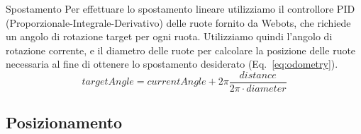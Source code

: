 \documentclass[10pt]{beamer}
\begin{document}
	\begin{frame}{Spostamento}
		Per effettuare lo spostamento lineare utilizziamo il controllore PID
		(Proporzionale-Integrale-Derivativo) delle ruote fornito da Webots, che
		richiede un angolo di rotazione target per ogni ruota. Utilizziamo quindi
		l'angolo di rotazione corrente, e il diametro delle ruote per calcolare la
		posizione delle ruote necessaria al fine di ottenere lo spostamento
		desiderato (Eq.~\ref{eq:odometry}).
		\begin{equation}\label{eq:odometry}
		targetAngle =
		currentAngle+2\pi\frac    {distance}
						{2\pi \cdot diameter}
		\end{equation}
	\end{frame}
	
	\subsection{Posizionamento}\label{subsec:Posizionamento}
\end{document}
